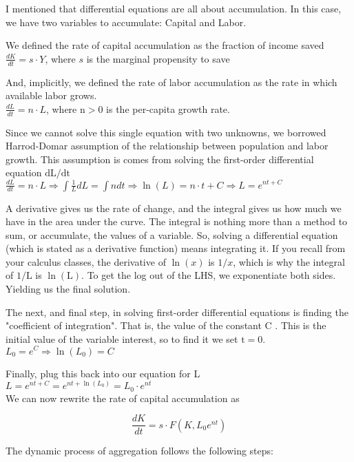 \documentclass[10pt]{article}
\begin{document}
I mentioned that differential equations are all about accumulation. In this case, we have two variables to accumulate: Capital and Labor.

We defined the rate of capital accumulation as the fraction of income saved\\
$\frac{d K}{d t}=s \cdot Y$, where $s$ is the marginal propensity to save

And, implicitly, we defined the rate of labor accumulation as the rate in which available labor grows.\\
$\frac{d L}{d t}=n \cdot L$, where $\mathrm{n}>0$ is the per-capita growth rate.

Since we cannot solve this single equation with two unknowns, we borrowed Harrod-Domar assumption of the relationship between population and labor growth. This assumption is comes from solving the first-order differential equation $\mathrm{dL} / \mathrm{dt}$\\
$\frac{d L}{d t}=n \cdot L \Rightarrow \int \frac{1}{L} d L=\int n d t \Rightarrow \ln (L)=n \cdot t+C \Rightarrow L=e^{n t+C}$

A derivative gives us the rate of change, and the integral gives us how much we have in the area under the curve. The integral is nothing more than a method to sum, or accumulate, the values of a variable. So, solving a differential equation (which is stated as a derivative function) means integrating it. If you recall from your calculus classes, the derivative of $\ln (x)$ is $1 / x$, which is why the integral of $1 / \mathrm{L}$ is $\ln (\mathrm{L})$. To get the log out of the LHS, we exponentiate both sides. Yielding us the final solution.

The next, and final step, in solving first-order differential equations is finding the "coefficient of integration". That is, the value of the constant C . This is the initial value of the variable interest, so to find it we set $\mathrm{t}=0$.\\
$L_{0}=e^{C} \Rightarrow \ln \left(L_{0}\right)=C$

Finally, plug this back into our equation for L\\
$L=e^{n t+C}=e^{n t+\ln \left(L_{0}\right)}=L_{0} \cdot e^{n t}$\\
We can now rewrite the rate of capital accumulation as

$$
\frac{d K}{d t}=s \cdot F\left(K, L_{0} e^{n t}\right)
$$

The dynamic process of aggregation follows the following steps:
\end{document}
